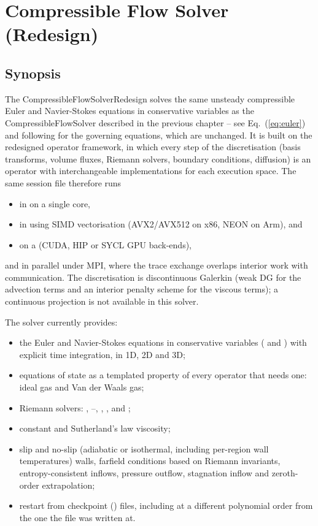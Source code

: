 \chapter{Compressible Flow Solver (Redesign)}
\label{chap:compressibleFlowRedesign}

\section{Synopsis}
The CompressibleFlowSolverRedesign solves the same unsteady compressible
Euler and Navier-Stokes equations in conservative variables as the
CompressibleFlowSolver described in the previous chapter -- see
Eq.~(\ref{eq:euler}) and following for the governing equations, which are
unchanged. It is built on the redesigned operator framework, in which every
step of the discretisation (basis transforms, volume fluxes, Riemann
solvers, boundary conditions, diffusion) is an operator with
interchangeable implementations for each execution space. The same session
file therefore runs

\begin{itemize}
\item in  on a single core,
\item in  using SIMD vectorisation (AVX2/AVX512 on x86, NEON on
  Arm), and
\item on a  (CUDA, HIP or SYCL GPU back-ends),
\end{itemize}

and in parallel under MPI, where the trace exchange overlaps interior work
with communication. The discretisation is discontinuous Galerkin (weak DG
for the advection terms and an interior penalty scheme for the viscous
terms); a continuous projection is not available in this solver.

The solver currently provides:

\begin{itemize}
\item the Euler and Navier-Stokes equations in conservative variables
  ( and ) with explicit time
  integration, in 1D, 2D and 3D;
\item equations of state as a templated property of every operator that
  needs one: ideal gas and Van der Waals gas;
\item Riemann solvers: , --,
  , ,  and ;
\item constant and Sutherland's law viscosity;
\item slip and no-slip (adiabatic or isothermal, including per-region wall
  temperatures) walls, farfield conditions based on Riemann invariants,
  entropy-consistent inflows, pressure outflow, stagnation inflow and
  zeroth-order extrapolation;
\item restart from checkpoint () files, including at a
  different polynomial order from the one the file was written at.
\end{itemize}

